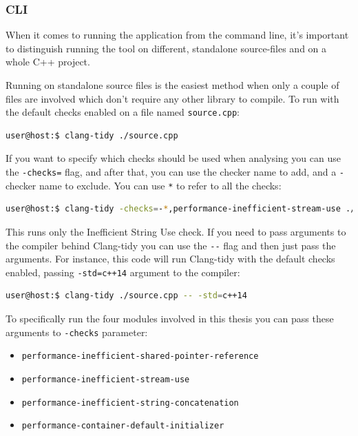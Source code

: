 \subsubsection{CLI}
\par When it comes to running the application from the command line, it's important to distinguish running the tool on different, standalone source-files and on a whole C++ project. \medskip
\par Running on standalone source files is the easiest method when only a couple of files are involved which don't require any other library to compile. To run with the default checks enabled on a file named \verb|source.cpp|:
\begin{lstlisting}[language=bash, frame=single]
user@host:$ clang-tidy ./source.cpp
\end{lstlisting}
\par If you want to specify which checks should be used when analysing you can use the \verb|-checks=| flag, and after that, you can use the checker name to add, and a \verb|-| checker name to exclude. You can use \verb|*| to refer to all the checks:
 \begin{lstlisting}[language=bash, frame=single]
 user@host:$ clang-tidy -checks=-*,performance-inefficient-stream-use ./source.cpp
 \end{lstlisting}
 \par This runs only the Inefficient String Use check. If you need to pass arguments to the compiler behind Clang-tidy you can use the \verb|--| flag and then just pass the arguments. For instance, this code will run Clang-tidy with the default checks enabled, passing \verb|-std=c++14| argument to the compiler:
 \begin{lstlisting}[language=bash, frame=single]
 user@host:$ clang-tidy ./source.cpp -- -std=c++14
 \end{lstlisting}
 \par To specifically run the four modules involved in this thesis you can pass these arguments to \verb|-checks| parameter:
 \begin{itemize}
     \item \verb|performance-inefficient-shared-pointer-reference|
     \item \verb|performance-inefficient-stream-use|
     \item \verb|performance-inefficient-string-concatenation|
     \item \verb|performance-container-default-initializer|
 \end{itemize}

